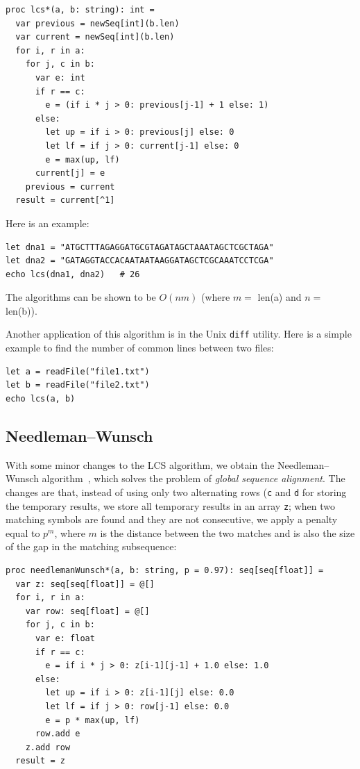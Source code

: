 \documentclass[justified, sixbynine]{tufte-book}
\def\ft{\small\tt}
\theoremstyle{plain}%
\newtheorem * {corollary}{Corollary}
\theoremstyle{definition}
\theoremstyle{remark}
\newtheorem * {remark}{Remark}
\newtheorem * {note}{Note}
\begin{document}
\begin{fullwidth}
\begin{lstlisting}[caption={in file: {\ft nlib/text.nim}}]
proc lcs*(a, b: string): int =
  var previous = newSeq[int](b.len)
  var current = newSeq[int](b.len)
  for i, r in a:
    for j, c in b:
      var e: int
      if r == c:
        e = (if i * j > 0: previous[j-1] + 1 else: 1)
      else:
        let up = if i > 0: previous[j] else: 0
        let lf = if j > 0: current[j-1] else: 0
        e = max(up, lf)
      current[j] = e
    previous = current
  result = current[^1]
\end{lstlisting}

Here is an example:

\begin{lstlisting}
let dna1 = "ATGCTTTAGAGGATGCGTAGATAGCTAAATAGCTCGCTAGA"
let dna2 = "GATAGGTACCACAATAATAAGGATAGCTCGCAAATCCTCGA"
echo lcs(dna1, dna2)   # 26
\end{lstlisting}

The algorithms can be shown to be $O(nm)$ (where $m=$ len(a) and $n=$ len(b)).

Another application of this algorithm is in the Unix {\ft diff} utility. Here is a simple example to find the number of common lines between two files:

\begin{lstlisting}
let a = readFile("file1.txt")
let b = readFile("file2.txt")
echo lcs(a, b)
\end{lstlisting}

\subsection{Needleman--Wunsch}


With some minor changes to the LCS algorithm, we obtain the Needleman--Wunsch algorithm~\cite{needleman}, which solves the problem of {\it global sequence alignment}. The changes are that, instead of using only two alternating rows ({\ft c} and {\ft d} for storing the temporary results, we store all temporary results in an array {\ft z}; when two matching symbols are found and they are not consecutive, we apply a penalty equal to $p^m$, where $m$ is the distance between the two matches and is also the size of the gap in the matching subsequence:


\begin{lstlisting}[caption={in file: {\ft nlib/text.nim}}]
proc needlemanWunsch*(a, b: string, p = 0.97): seq[seq[float]] =
  var z: seq[seq[float]] = @[]
  for i, r in a:
    var row: seq[float] = @[]
    for j, c in b:
      var e: float
      if r == c:
        e = if i * j > 0: z[i-1][j-1] + 1.0 else: 1.0
      else:
        let up = if i > 0: z[i-1][j] else: 0.0
        let lf = if j > 0: row[j-1] else: 0.0
        e = p * max(up, lf)
      row.add e
    z.add row
  result = z
\end{lstlisting}


\end{fullwidth}
\end{document}
